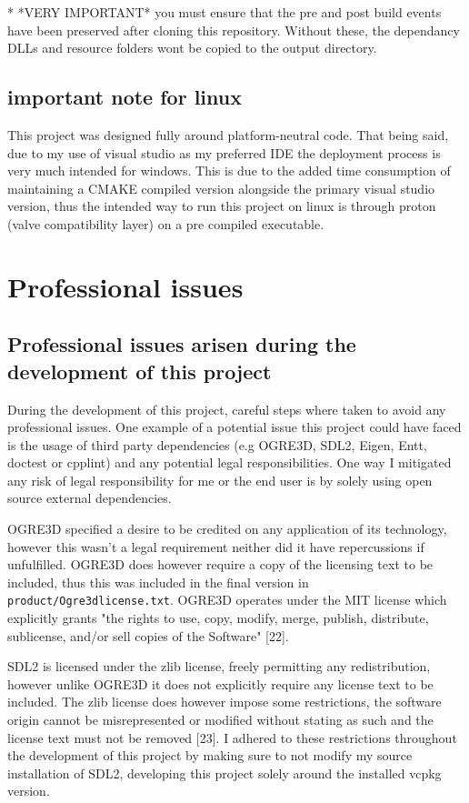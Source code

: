 \documentclass[]{final_report}
\begin{document}
* *VERY IMPORTANT* you must ensure that the pre and post build events have been preserved after cloning this repository. Without these, the dependancy DLLs and resource folders wont be copied to the output directory.
\section {important note for linux}

This project was designed fully around platform-neutral code. That being said, due to my use of visual studio as my preferred IDE the deployment process is very much intended for windows. This is due to the added time consumption of maintaining a CMAKE compiled version alongside the primary visual studio version, thus the intended way to run this project on linux is through proton (valve compatibility layer) on a pre compiled executable.


\chapter {Professional issues}
\section {Professional issues arisen during the development of this project}

During the development of this project, careful steps where taken to avoid any professional issues. One example of a potential issue this project could have faced is the usage of third party dependencies (e.g OGRE3D, SDL2, Eigen, Entt, doctest or cpplint) and any potential legal responsibilities. One way I mitigated any risk of legal responsibility for me or the end user is by solely using open source external dependencies. 

OGRE3D specified a desire to be credited on any application of its technology, however this wasn't a legal requirement neither did it have repercussions if unfulfilled. OGRE3D does however require a copy of the licensing text to be included, thus this was included in the final version in \texttt{product/Ogre3dlicense.txt}. OGRE3D operates under the MIT license which explicitly grants "the rights to use, copy, modify, merge, publish, distribute, sublicense, and/or sell copies of the Software" [22].

SDL2 is licensed under the zlib license, freely permitting any redistribution, however unlike OGRE3D it does not explicitly require any license text to be included. The zlib license does however impose some restrictions, the software origin cannot be misrepresented or modified without stating as such and the license text must not be removed [23]. I adhered to these restrictions throughout the development of this project by making sure to not modify my source installation of SDL2, developing this project solely around the installed vcpkg version.
\end{document}
